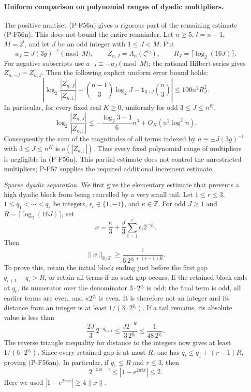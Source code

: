 \paragraph{Uniform comparison on polynomial ranges of dyadic multipliers.}
The positive multiset (P-F56u) gives a rigorous part of the
remaining estimate (P-F56n). This does not bound the entire
remainder. Let $n\ge5$, $l=n-1$, $M=2^l$, and let $J$ be an
odd integer with $1\le J<M$. Put
\[
 a_J\equiv J(3g)^{-1}\pmod M,\qquad
 Z_{n,J}=A_n(\zeta^{a_J}),\qquad
 R_J=\lceil\log_2(16J)\rceil.
 \tag{P-F56ak}
\]
For negative subscripts use $a_{-J}\equiv-a_J\pmod M$;
the rational Hilbert series gives
$Z_{n,-J}=\overline{Z_{n,J}}$.
Then the following explicit uniform error bound holds:
\[
 \left|\log_2\frac{|Z_{n,J}|}{|Z_{n,1}|}
       +\binom{n-1}{3}\log_2J
       -\mathbf1_{3\mid J}\binom n3\right|
       \le 100n^2R_J^2.
 \tag{P-F56al}
\]
In particular, for every fixed real $K\ge0$, uniformly for
odd $3\le J\le n^K$,
\[
 \log_2\frac{|Z_{n,J}|}{|Z_{n,1}|}
 \le -\frac{\log_2 3-1}{6}n^3
                         +O_K(n^2\log^2 n).
 \tag{P-F56am}
\]
Consequently the sum of the magnitudes of all terms indexed
by $a\equiv\pm J(3g)^{-1}$ with $3\le J\le n^K$ is
$o(|Z_{n,1}|)$. Thus every fixed polynomial range of
multipliers is negligible in (P-F56n). This partial estimate
does not control the unrestricted multipliers; P-F57 supplies
the required additional increment estimate.

\emph{Sparse dyadic separation.}
We first give the elementary estimate that prevents a high
dyadic block from being cancelled by a very small tail.
Let $1\le r\le3$, $1\le q_1<\cdots<q_r$ be integers,
$\epsilon_i\in\{1,-1\}$, and $\kappa\in\mathbb Z$.
For odd $J\ge1$ and $R=\lceil\log_2(16J)\rceil$, set
\[
 x=\frac\kappa3+
              \frac J3\sum_{i=1}^r\epsilon_i2^{-q_i}.
\]
Then
\[
 \|x\|_{\mathbb R/\mathbb Z}
       \ge\frac1{6\,2^{q_1+(r-1)R}}.
 \tag{P-F56an}
\]
To prove this, retain the initial block ending just before
the first gap $q_{i+1}-q_i>R$, or retain all terms if no
such gap occurs. If the retained block ends at $q_t$, its
numerator over the denominator $3\cdot2^{q_t}$ is odd:
the final term is odd, all earlier terms are even, and
$\kappa2^{q_t}$ is even. It is therefore not an integer
and its distance from an integer is at least
$1/(3\cdot2^{q_t})$.
If a tail remains, its absolute value is less than
\[
 \frac{2J}{3}\,2^{-q_{t+1}}
 \le\frac{J2^{-R}}{3\,2^{q_t}}
 \le\frac1{48\,2^{q_t}}.
\]
The reverse triangle inequality for distance to the
integers now gives at least $1/(6\cdot2^{q_t})$.
Since every retained gap is at most $R$, one has
$q_t\le q_1+(r-1)R$, proving (P-F56an).
In particular, if $q_1\le R$ and $r\le3$, then
\[
 2^{-3R-1}\le |1-e^{2\pi ix}|\le2.
 \tag{P-F56ao}
\]
Here we used $|1-e^{2\pi ix}|\ge4\|x\|$.

